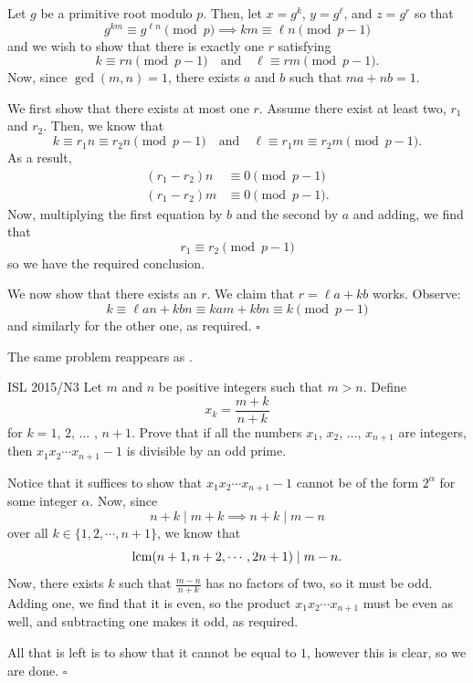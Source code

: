\documentclass{article}
\begin{document}
Let $g$ be a primitive root modulo $p$. Then, let $x = g^k$, $y = g^{\ell}$, and $z = g^r$ so that \[g^{km} \equiv g^{\ell n} \pmod{p} \implies km \equiv \ell n \pmod{p-1}\] and we wish to show that there is exactly one $r$ satisfying \[k \equiv rn \pmod{p-1} \quad \text{and} \quad \ell \equiv rm \pmod{p-1}.\] Now, since $\gcd(m, n) = 1$, there exists $a$ and $b$ such that $ma+nb = 1$. 

We first show that there exists at most one $r$. Assume there exist at least two, $r_1$ and $r_2$. Then, we know that \[k \equiv r_1n \equiv r_2n \pmod{p-1} \quad \text{and} \quad \ell \equiv r_1m \equiv r_2m \pmod{p-1}.\] As a result,
\begin{align*}
(r_1-r_2)n &\equiv 0 \pmod{p-1} \\
(r_1-r_2)m &\equiv 0 \pmod{p-1}.
\end{align*}
Now, multiplying the first equation by $b$ and the second by $a$ and adding, we find that \[r_1 \equiv r_2 \pmod{p-1}\] so we have the required conclusion.

We now show that there exists an $r$. We claim that $r = \ell a + kb$ works. Observe: \[k \equiv \ell an + kbn \equiv kam + kbn \equiv k \pmod{p-1}\] and similarly for the other one, as required. $\square$

\begin{remark*}
The same problem reappears as .
\end{remark*}

\begin{problem}[2.14.16]{ISL 2015/N3}
Let $m$ and $n$ be positive integers such that $m > n$. Define \[x_k = \dfrac{m + k}{n + k}\] for $k = 1$, $2$, $\dots$ , $n + 1$. Prove that if all the numbers $x_1$, $x_2$, $\dots$, $x_{n+1}$ are integers, then $x_1x_2\cdots x_{n+1} - 1$ is divisible by an odd prime.
\end{problem}

Notice that it suffices to show that $x_1x_2\cdots x_{n+1} - 1$ cannot be of the form $2^{\alpha}$ for some integer $\alpha$. Now, since \[n+k \mid m+k \implies n+k \mid m-n\] over all $k \in \{1, 2, \cdots, n+1\}$, we know that \[\operatorname{lcm}(n+1, n+2, \cdots, 2n+1) \mid m-n.\] Now, there exists $k$ such that $\tfrac{m-n}{n+k}$ has no factors of two, so it must be odd. Adding one, we find that it is even, so the product $x_1x_2\cdots x_{n+1}$ must be even as well, and subtracting one makes it odd, as required. 

All that is left is to show that it cannot be equal to $1$, however this is clear, so we are done. $\square$
\end{document}
